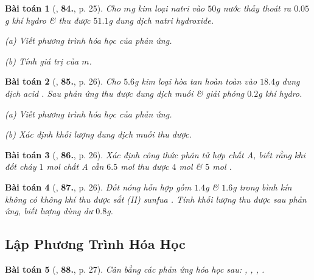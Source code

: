 \documentclass{article}
\numberwithin{equation}{section}
\newtheorem{baitoan}{Bài toán}[section]
\begin{document}
\begin{baitoan}[\cite{An2011}, \textbf{84.}, p. 25]
	Cho $m$g kim loại natri vào $50$g nước thấy thoát ra $0.05$g khí hydro \& thu được $51.1$g dung dịch natri hydroxide.
	\begin{enumerate*}
		\item[(a)] Viết phương trình hóa học của phản ứng.
		\item[(b)] Tính giá trị của $m$.
	\end{enumerate*}
\end{baitoan}

\begin{baitoan}[\cite{An2011}, \textbf{85.}, p. 26]
	Cho $5.6$g kim loại  hòa tan hoàn  toàn vào $18.4$g dung dịch acid . Sau phản ứng thu được dung dịch muối  \& giải phóng $0.2$g khí hydro.
	\begin{enumerate*}
		\item[(a)] Viết phương trình hóa học của phản ứng.
		\item[(b)] Xác định khối lượng dung dịch muối  thu được.
	\end{enumerate*}
\end{baitoan}

\begin{baitoan}[\cite{An2011}, \textbf{86.}, p. 26]
	Xác định công thức phân tử hợp chất A, biết rằng khi đốt cháy $1$ mol chất A cần $6.5$ mol  thu được $4$ mol  \& $5$ mol .
\end{baitoan}

\begin{baitoan}[\cite{An2011}, \textbf{87.}, p. 26]
	Đốt nóng hỗn hợp gồm $1.4$g  \& $1.6$g  trong bình kín không có không khí thu được sắt (II) sunfua . Tính khối lượng  thu được sau phản ứng, biết lượng  dùng dư $0.8$g.
\end{baitoan}


\subsection{Lập Phương Trình Hóa Học}

\begin{baitoan}[\cite{An2011}, \textbf{88.}, p. 27]
	Cân bằng các phản ứng hóa học sau: \emph{, , , }. 
\end{baitoan}
\end{document}
